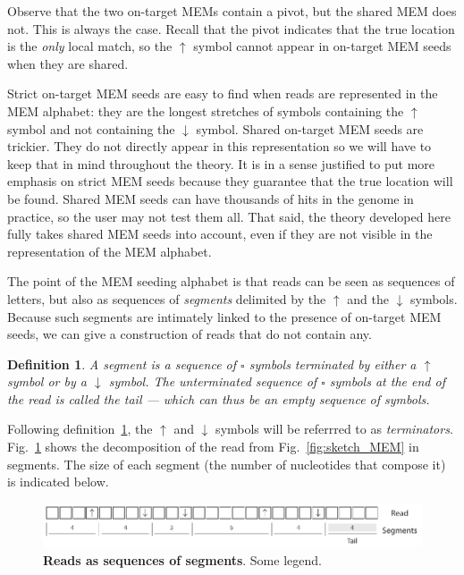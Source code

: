 \documentclass{article}
\newtheorem{definition}{Definition}
\begin{document}
Observe that the two on-target MEMs contain a pivot, but the shared MEM
does not. This is always the case. Recall that the pivot indicates that
the true location is the \emph{only} local match, so the $\uparrow$ symbol
cannot appear in on-target MEM seeds when they are shared.

Strict on-target MEM seeds are easy to find when reads are represented in
the MEM alphabet: they are the longest stretches of symbols containing the
$\uparrow$ symbol and not containing the $\downarrow$ symbol. Shared
on-target MEM seeds are trickier. They do not directly appear in this
representation so we will have to keep that in mind throughout the theory.
It is in a sense justified to put more emphasis on strict MEM seeds
because they guarantee that the true location will be found. Shared MEM
seeds can have thousands of hits in the genome in practice, so the user
may not test them all. That said, the theory developed here fully takes
shared MEM seeds into account, even if they are not visible in the
representation of the MEM alphabet.

The point of the MEM seeding alphabet is that reads can be seen as
sequences of letters, but also as sequences of \emph{segments} delimited
by the $\uparrow$ and the $\downarrow$ symbols. Because such segments are
intimately linked to the presence of on-target MEM seeds, we can give a
construction of reads that do not contain any.

\begin{definition}
\label{def:segment}
A segment is a sequence of $\square$ symbols terminated by either a
$\uparrow$ symbol or by a $\downarrow$ symbol. The unterminated sequence
of $\square$ symbols at the end of the read is called the tail --- which
can thus be an empty sequence of symbols.
\end{definition}

Following definition~\ref{def:segment}, the $\uparrow$ and $\downarrow$
symbols will be referrred to as \emph{terminators}.
Fig.~\ref{fig:sketch_segment} shows the decomposition of the read from
Fig.~\ref{fig:sketch_MEM} in segments. The size of each segment (the
number of nucleotides that compose it) is indicated below.

\begin{figure}[h]
\centering
\includegraphics[scale=.85]{sketch_segments.pdf}
\caption{\textbf{Reads as sequences of segments}. 
Some legend.}
\label{fig:sketch_segment}
\end{figure}
\end{document}
